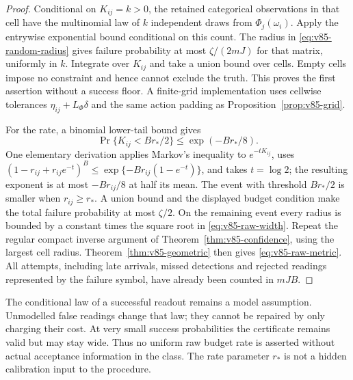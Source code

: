 \begin{proof}
Conditional on $K_{ij}=k>0$, the retained categorical observations in
that cell have the multinomial law of $k$ independent draws from
$\Phi_j(\omega_i)$. Apply the entrywise exponential bound conditional
on this count. The radius in \eqref{eq:v85-random-radius} gives
failure probability at most $\zeta/(2mJ)$ for that matrix, uniformly
in $k$. Integrate over $K_{ij}$ and take a union bound over cells.
Empty cells impose no constraint and hence cannot exclude the truth.
This proves the first assertion without a success floor. A finite-grid
implementation uses cellwise tolerances $\eta_{ij}+L_\Phi\delta$
and the same action padding as Proposition~\ref{prop:v85-grid}.

For the rate, a binomial lower-tail bound gives
\[
 \Pr\{K_{ij}<B r_*/2\}\le \exp(-B r_*/8).
\]
One elementary derivation applies Markov's inequality to
$e^{-tK_{ij}}$, uses
$(1-r_{ij}+r_{ij}e^{-t})^B\le
\exp\{-B r_{ij}(1-e^{-t})\}$, and takes $t=\log2$;
the resulting exponent is at most $-B r_{ij}/8$ at half its mean.
The event with threshold $B r_*/2$ is smaller when $r_{ij}\ge r_*$.
A union bound and the displayed budget condition make the total
failure probability at most $\zeta/2$. On the remaining event every
radius is bounded by a constant times the square root in
\eqref{eq:v85-raw-width}. Repeat the regular compact inverse argument
of Theorem~\ref{thm:v85-confidence}, using the largest cell radius.
Theorem~\ref{thm:v85-geometric} then gives
\eqref{eq:v85-raw-metric}. All attempts, including late arrivals,
missed detections and rejected readings represented by the failure
symbol, have already been counted in $mJB$.
\end{proof}
The conditional law of a successful readout remains a model assumption.
Unmodelled false readings change that law; they cannot be repaired by
only charging their cost. At very small success probabilities the
certificate remains valid but may stay wide. Thus no uniform raw
budget rate is asserted without actual acceptance information in the
class. The rate parameter $r_*$ is not a hidden calibration input to
the procedure.

